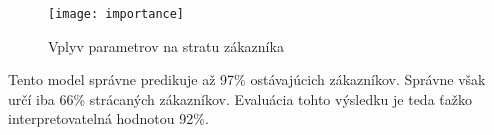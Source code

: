 \begin{figure}[H]
\begin{center}
\texttt{[image: importance]}\end{center}
\caption[importance]{Vplyv parametrov na stratu zákazníka}\label{fig:importance}
\end{figure}

Tento model správne predikuje až 97\% ostávajúcich zákazníkov. Správne však určí iba 66\% strácaných zákazníkov. Evaluácia tohto výsledku je teda ťažko interpretovatelná hodnotou 92\%. 



\begin{comment}
\section{Časť}
\label{sec:Časť}
V tejto časti sa venujeme 
\begin{figure}[H]
\begin{center}\texttt{[image: figure]}\end{center}
\caption[Name figure]{Name figure}\label{fig:figure}
\end{figure}

\subsection{Číslovaný zoznam}
\begin{my_enumerate}
	\item {cieľ 1}
	\begin{my_enumerate}
		\item {cieľ 1.a}
		\item {cieľ 1.b}
	\end{my_enumerate}
	\item {cieľ 2}
	\item {cieľ 3}
\end{my_enumerate}

\subsection{Citácia}
Lorem ipsum dolor sit amet, consectetuer adipiscing elit, sed diam nonummy nibh euismod tincidunt ut laoreet dolore magna aliquam erat volutpat~\cite{1}.


\end{comment}
